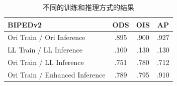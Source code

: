 \documentclass[a4paper]{ctexart}
\begin{document}
		\begin{table}[!htbp]
			\centering
			\small
				\begin{tabular}{>{\centering\arraybackslash}m{5cm}|c|c|c}
					
					\hline
					
					\textbf{BIPEDv2} & \textbf{ODS} & \textbf{OIS} & \textbf{AP}  \\
					
					\hline
					
					Ori Train / Ori Inference  & .895 & .900 & .927 \\
					
					LL Train / LL Inference    & .100 & .130 & .130 \\

					Ori Train / LL Inference   & .751 & .780 & .712 \\
					
					Ori Train / Enhanced Inference & .789 & .795 & .910 \\				
					\hline
					
				\end{tabular}
			\caption{
				\label{tab: Result}
				不同的训练和推理方式的结果} %
			
		\end{table}
		
\end{document}
